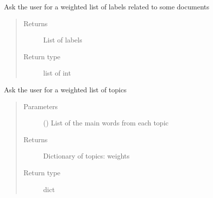 \documentclass[letterpaper,10pt,english]{sphinxmanual}
\begin{document}
\begin{fulllineitems}
\begin{fulllineitems}
\begin{quote}
\begin{description}
\end{description}\end{quote}

\end{fulllineitems}


\begin{fulllineitems}
\label{\detokenize{dc_query_manager:src.query_manager.QueryManager.ask_labels}}
\sphinxAtStartPar
Ask the user for a weighted list of labels related to some documents
\begin{quote}\begin{description}
\item[{Returns}] \leavevmode
\sphinxAtStartPar
{} \textendash{} List of labels

\item[{Return type}] \leavevmode
\sphinxAtStartPar
list of int

\end{description}\end{quote}

\end{fulllineitems}


\begin{fulllineitems}
\label{\detokenize{dc_query_manager:src.query_manager.QueryManager.ask_topics}}
\sphinxAtStartPar
Ask the user for a weighted list of topics
\begin{quote}\begin{description}
\item[{Parameters}] \leavevmode
\sphinxAtStartPar
{} () \textendash{} List of the main words from each topic

\item[{Returns}] \leavevmode
\sphinxAtStartPar
{} \textendash{} Dictionary of topics: weights

\item[{Return type}] \leavevmode
\sphinxAtStartPar
dict


\end{description}
\end{quote}
\end{fulllineitems}
\end{fulllineitems}
\end{document}
